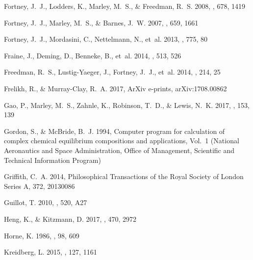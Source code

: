 \documentclass[twocolumn, trackchanges]{aastex61}
\begin{document}
\begin{thebibliography}{}
{Fortney}, J.~J., {Lodders}, K., {Marley}, M.~S., \& {Freedman}, R.~S. 2008,
  \apj, 678, 1419

{Fortney}, J.~J., {Marley}, M.~S., \& {Barnes}, J.~W. 2007, \apj, 659, 1661

{Fortney}, J.~J., {Mordasini}, C., {Nettelmann}, N., {et~al.} 2013, \apj, 775,
  80

{Fraine}, J., {Deming}, D., {Benneke}, B., {et~al.} 2014, \nat, 513, 526

{Freedman}, R.~S., {Lustig-Yaeger}, J., {Fortney}, J.~J., {et~al.} 2014, \apjs,
  214, 25

{Frelikh}, R., \& {Murray-Clay}, R.~A. 2017, ArXiv e-prints, arXiv:1708.00862

{Gao}, P., {Marley}, M.~S., {Zahnle}, K., {Robinson}, T.~D., \& {Lewis}, N.~K.
  2017, \aj, 153, 139

Gordon, S., \& McBride, B.~J. 1994, Computer program for calculation of complex
  chemical equilibrium compositions and applications, Vol.~1 (National
  Aeronautics and Space Administration, Office of Management, Scientific and
  Technical Information Program)

{Griffith}, C.~A. 2014, Philosophical Transactions of the Royal Society of
  London Series A, 372, 20130086

{Guillot}, T. 2010, \aap, 520, A27

{Heng}, K., \& {Kitzmann}, D. 2017, \mnras, 470, 2972

{Horne}, K. 1986, \pasp, 98, 609

{Kreidberg}, L. 2015, \pasp, 127, 1161


\end{thebibliography}
\end{document}
